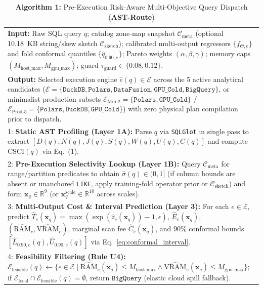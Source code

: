 \documentclass[10pt,a4paper]{article}
\newenvironment{fitasttable}{%
  \begin{lrbox}{\asttblbox}%
}{%
  \end{lrbox}%
  \sbox{\asttblboxB}{%
    \ifdim\wd\asttblbox>0.96\textwidth
      \resizebox{0.96\textwidth}{!}{\usebox{\asttblbox}}%
    \else
      \usebox{\asttblbox}%
    \fi
  }%
  \ifdim\ht\asttblboxB>0.72\textheight
    \resizebox{!}{0.72\textheight}{\usebox{\asttblboxB}}%
  \else
    \usebox{\asttblboxB}%
  \fi
}
\begin{document}
\begin{table}[!t]
\centering
\caption*{{\bf Algorithm 1:} Pre-Execution Risk-Aware Multi-Objective Query Dispatch (\textbf{AST-Route})}\label{alg:ast_route}
\footnotesize
\begin{fitasttable}
\begin{tabular}{@{}p{}@{}}
\toprule
\textbf{Input:} Raw SQL query $q$; catalog zone-map snapshot $\mathcal{C}_{\text{meta}}$ (optional 10.18~KB string/skew sketch $\mathcal{C}_{\text{sketch}}$); calibrated multi-output regressors $\{f_{\Theta,e}\}$ and fold conformal quantiles $\{\hat{q}_{0.90,e}\}$; Pareto weights $(\alpha,\beta,\gamma)$; memory caps $(M_{\text{host\_max}}, M_{\text{gpu\_max}})$; guard $\tau_{\text{guard}}\in\{0.08, 0.12\}$. \\
\textbf{Output:} Selected execution engine $\hat{e}(q) \in \mathcal{E}$ across the 5 active analytical candidates ($\mathcal{E} = \{\texttt{DuckDB}, \texttt{Polars}, \texttt{DataFusion}, \texttt{GPU\_Cold}, \texttt{BigQuery}\}$, or minimalist production subsets $\mathcal{E}_{\text{Min-2}}=\{\texttt{Polars},\texttt{GPU\_Cold}\}$ / $\mathcal{E}_{\text{Prod-3}}=\{\texttt{Polars},\texttt{DuckDB},\texttt{GPU\_Cold}\}$) with zero physical plan compilation prior to dispatch. \\
\midrule
1: \textbf{Static AST Profiling (Layer 1A):} Parse $q$ via \texttt{SQLGlot} in single pass to extract $[D(q),N(q),J(q),S(q),W(q),U(q),C(q)]$ and compute $\text{CSCI}(q)$ via Eq.~(1). \\
2: \textbf{Pre-Execution Selectivity Lookup (Layer 1B):} Query $\mathcal{C}_{\text{meta}}$ for range/partition predicates to obtain $\hat{\sigma}(q) \in (0,1]$ (if column bounds are absent or unanchored \texttt{LIKE}, apply training-fold operator prior or $\mathcal{C}_{\text{sketch}}$) and form $\mathbf{x}_q \in \mathbb{R}^{9}$ (or $\mathbf{x}_q^{\text{scale}} \in \mathbb{R}^{10}$ across scales). \\
3: \textbf{Multi-Output Cost \& Interval Prediction (Layer 3):} For each $e \in \mathcal{E}$, predict $\hat{T}_e(\mathbf{x}_q) = \max(\exp(\hat{z}_e(\mathbf{x}_q))-1,\epsilon)$, $\hat{E}_e(\mathbf{x}_q)$, $(\widehat{\text{RAM}}_e, \widehat{\text{VRAM}}_e)$, marginal scan fee $\hat{C}_e(\mathbf{x}_q)$, and $90\%$ conformal bounds $[\hat{L}_{0.90,e}(q), \hat{U}_{0.90,e}(q)]$ via Eq.~\eqref{eq:conformal_interval}. \\
4: \textbf{Feasibility Filtering (Rule U4):} $\mathcal{E}_{\text{feasible}}(q) \leftarrow \{e \in \mathcal{E} \mid \widehat{\text{RAM}}_e(\mathbf{x}_q) \le M_{\text{host\_max}} \wedge \widehat{\text{VRAM}}_e(\mathbf{x}_q) \le M_{\text{gpu\_max}}\}$; if $\mathcal{E}_{\text{local}} \cap \mathcal{E}_{\text{feasible}}(q) = \emptyset$, return $\texttt{BigQuery}$ (elastic cloud spill fallback). \\

\end{tabular}
\end{fitasttable}
\end{table}
\end{document}
